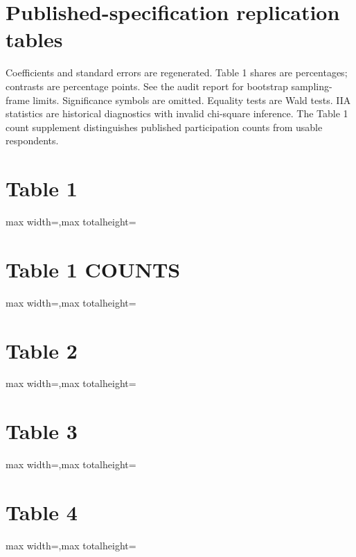 \documentclass[10pt]{article}
\begin{document}
\section*{Published-specification replication tables}
Coefficients and standard errors are regenerated. Table 1 shares are percentages; contrasts are percentage points.
See the audit report for bootstrap sampling-frame limits. Significance symbols are omitted.
Equality tests are Wald tests. IIA statistics are historical diagnostics with invalid chi-square inference.
The Table 1 count supplement distinguishes published participation counts from usable respondents.
\clearpage
\section*{Table 1}
\begin{adjustbox}{max width=\textwidth,max totalheight=\dimexpr\textheight-3cm\relax}\end{adjustbox}
\clearpage
\section*{Table 1 COUNTS}
\begin{adjustbox}{max width=\textwidth,max totalheight=\dimexpr\textheight-3cm\relax}\end{adjustbox}
\clearpage
\section*{Table 2}
\begin{adjustbox}{max width=\textwidth,max totalheight=\dimexpr\textheight-3cm\relax}\end{adjustbox}
\clearpage
\section*{Table 3}
\begin{adjustbox}{max width=\textwidth,max totalheight=\dimexpr\textheight-3cm\relax}\end{adjustbox}
\clearpage
\section*{Table 4}
\begin{adjustbox}{max width=\textwidth,max totalheight=\dimexpr\textheight-3cm\relax}\end{adjustbox}
\clearpage
\end{document}
